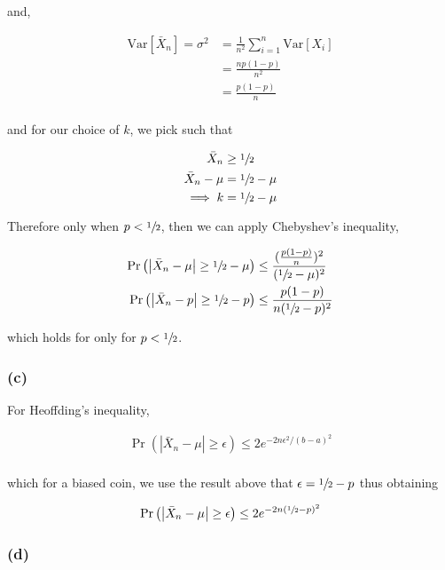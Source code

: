 \documentclass[letterpaper,10pt]{article} %
\newcommand{\pr}[1]{\Pr\left( #1 \right)}
\begin{document}
and,

\begin{align*}
\mathrm{Var}\left[ \bar{X}_n \right] = \sigma^2 &= \frac{1}{n^2} \sum_{i=1}^n\mathrm{Var}\left[X_i \right] \\
&= \frac{np(1-p)}{n^2} \\
&= \frac{p(1-p)}{n} \\
\end{align*}

and for our choice of $k$, we pick such that

\begin{align*}
\bar{X}_n &\geq \sfrac{1}{2} \\
\bar{X}_n - \mu &= \sfrac{1}{2} - \mu \\
\implies k &= \sfrac{1}{2}-\mu \\
\end{align*}

Therefore only when $p < \sfrac{1}{2}$, then we can apply Chebyshev's inequality,

\begin{align*}
\pr{\left|\bar{X}_n - \mu \right| \geq \sfrac{1}{2}-\mu} &\leq \frac{(\frac{p(1-p)}{n})^2}{(\sfrac{1}{2}-\mu)^2}\\
\pr{\left|\bar{X}_n - p\right| \geq \sfrac{1}{2}-p} &\leq \frac{p(1-p)}{n(\sfrac{1}{2}-p)^2} \\
\end{align*}

which holds for only for $p<\sfrac{1}{2}$.

\subsubsection*{(c)}

For Heoffding's inequality, 

\begin{align*}
\pr{\left|\bar{X}_n - \mu \right| \geq \epsilon} \leq 2e^{-2n\epsilon^2 /(b-a)^2}\\
\end{align*}

which for a biased coin, we use the result above that $\epsilon = \sfrac{1}{2} - p$ thus obtaining

\begin{align*}
\pr{\left|\bar{X}_n - \mu \right| \geq \epsilon} \leq 2e^{-2n(\sfrac{1}{2} - p)^2}\\
\end{align*}

\subsubsection*{(d)}
\end{document}
